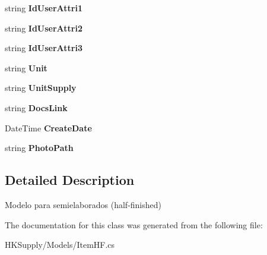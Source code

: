 \begin{DoxyCompactItemize}
\mbox{\label{class_h_k_supply_1_1_models_1_1_item_hf_a471f5ad1db02b908ac8a334ee93230b4}} 
string {\bfseries Id\+User\+Attri1}
\item 
\mbox{\label{class_h_k_supply_1_1_models_1_1_item_hf_a200eb14e79c7534e5ee7a7dc767cf7b5}} 
string {\bfseries Id\+User\+Attri2}
\item 
\mbox{\label{class_h_k_supply_1_1_models_1_1_item_hf_a2d52bc1156e6aab8f2929044d3a477fd}} 
string {\bfseries Id\+User\+Attri3}
\item 
\mbox{\label{class_h_k_supply_1_1_models_1_1_item_hf_af6d4c58c0089bf423d72e64da7d6c286}} 
string {\bfseries Unit}
\item 
\mbox{\label{class_h_k_supply_1_1_models_1_1_item_hf_aec66228895629bfc643904afaa8a184f}} 
string {\bfseries Unit\+Supply}
\item 
\mbox{\label{class_h_k_supply_1_1_models_1_1_item_hf_a4668fb0a5f308a17515a3001c8d92753}} 
string {\bfseries Docs\+Link}
\item 
\mbox{\label{class_h_k_supply_1_1_models_1_1_item_hf_a68e15eaa32189195cf527845f0d273e9}} 
Date\+Time {\bfseries Create\+Date}
\item 
\mbox{\label{class_h_k_supply_1_1_models_1_1_item_hf_abb61b29b462833eeeb1121321a9edcc4}} 
string {\bfseries Photo\+Path}
\end{DoxyCompactItemize}


\subsection{Detailed Description}
Modelo para semielaborados (half-\/finished) 



The documentation for this class was generated from the following file\+:\begin{DoxyCompactItemize}
\item 
H\+K\+Supply/\+Models/Item\+H\+F.\+cs\end{DoxyCompactItemize}
